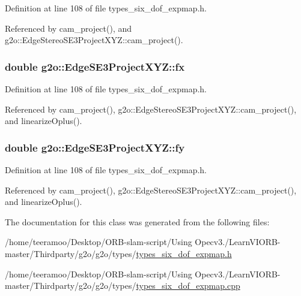 Definition at line 108 of file types\+\_\+six\+\_\+dof\+\_\+expmap.\+h.



Referenced by cam\+\_\+project(), and g2o\+::\+Edge\+Stereo\+S\+E3\+Project\+X\+Y\+Z\+::cam\+\_\+project().

\subsubsection[{\texorpdfstring{fx}{fx}}]{\setlength{\rightskip}{0pt plus 5cm}double g2o\+::\+Edge\+S\+E3\+Project\+X\+Y\+Z\+::fx}\hypertarget{classg2o_1_1EdgeSE3ProjectXYZ_a6af0a48bd4e21d060585d7ee9c1ca1ef}{}\label{classg2o_1_1EdgeSE3ProjectXYZ_a6af0a48bd4e21d060585d7ee9c1ca1ef}


Definition at line 108 of file types\+\_\+six\+\_\+dof\+\_\+expmap.\+h.



Referenced by cam\+\_\+project(), g2o\+::\+Edge\+Stereo\+S\+E3\+Project\+X\+Y\+Z\+::cam\+\_\+project(), and linearize\+Oplus().

\subsubsection[{\texorpdfstring{fy}{fy}}]{\setlength{\rightskip}{0pt plus 5cm}double g2o\+::\+Edge\+S\+E3\+Project\+X\+Y\+Z\+::fy}\hypertarget{classg2o_1_1EdgeSE3ProjectXYZ_af5f931cd13ef318a3f42f54aa57b9466}{}\label{classg2o_1_1EdgeSE3ProjectXYZ_af5f931cd13ef318a3f42f54aa57b9466}


Definition at line 108 of file types\+\_\+six\+\_\+dof\+\_\+expmap.\+h.



Referenced by cam\+\_\+project(), g2o\+::\+Edge\+Stereo\+S\+E3\+Project\+X\+Y\+Z\+::cam\+\_\+project(), and linearize\+Oplus().



The documentation for this class was generated from the following files\+:\begin{DoxyCompactItemize}
\item 
/home/teeramoo/\+Desktop/\+O\+R\+B-\/slam-\/script/\+Using Opecv3./\+Learn\+V\+I\+O\+R\+B-\/master/\+Thirdparty/g2o/g2o/types/\hyperlink{types__six__dof__expmap_8h}{types\+\_\+six\+\_\+dof\+\_\+expmap.\+h}\item 
/home/teeramoo/\+Desktop/\+O\+R\+B-\/slam-\/script/\+Using Opecv3./\+Learn\+V\+I\+O\+R\+B-\/master/\+Thirdparty/g2o/g2o/types/\hyperlink{types__six__dof__expmap_8cpp}{types\+\_\+six\+\_\+dof\+\_\+expmap.\+cpp}\end{DoxyCompactItemize}
